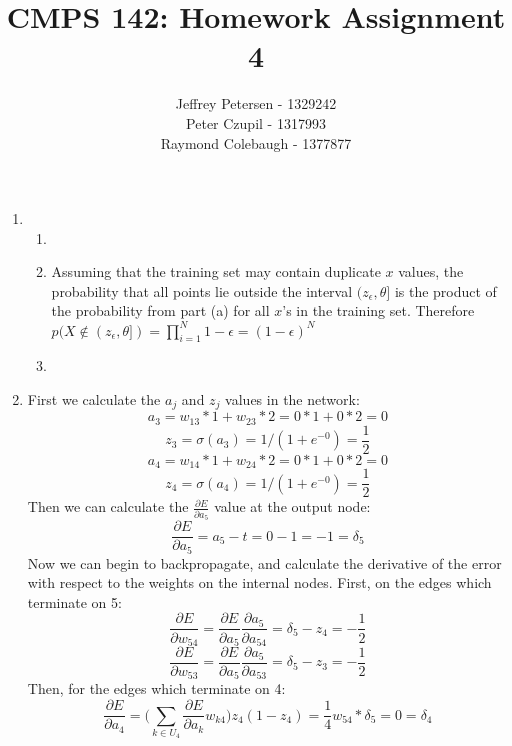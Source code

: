 \documentclass{article}
\title{CMPS 142: Homework Assignment 4}
\author{Jeffrey Petersen - 1329242\\Peter Czupil - 1317993\\Raymond Colebaugh - 1377877}
\begin{document}
\maketitle
\begin{enumerate}
        \item 
            \begin{enumerate}
                \item
                    \noindent{The probability that a point randomly drawn from $p$ is located somewhere in the interval $(z_{\epsilon}, \theta)$ is equal to $\epsilon$. Thus the probability that a point falls outside this interval is the complement of the previous probability. Therefore, $p((0, z_{\epsilon}]) = 1 - \epsilon$. }
                \item
                    Assuming that the training set may contain duplicate $x$ values, the probability that all points lie outside the interval $(z_{\epsilon}, \theta]$ is the product of the probability from part (a) for all $x$'s in the training set. Therefore $p(X \notin (z_{\epsilon}, \theta]) = \prod_{i = 1}^{N} 1 - \epsilon = (1 - \epsilon)^N$ 
                \item
            \end{enumerate}
        \item 
            First we calculate the $a_j$ and $z_j$ values in the network:
            $$ a_3 = w_{13} * 1 + w_{23} * 2 = 0 * 1 + 0 * 2 = 0 $$
            $$ z_3 = \sigma(a_3) = 1/(1+e^{-0}) = \frac{1}{2} $$
            $$ a_4 = w_{14} * 1 + w_{24} * 2 = 0 * 1 + 0 * 2 = 0 $$
            $$ z_4 = \sigma(a_4) = 1/(1+e^{-0}) = \frac{1}{2} $$
            Then we can calculate the $\frac{\partial E}{\partial a_5}$ value at the output node:
            $$ \frac{\partial E}{\partial a_5} = a_5 - t = 0 - 1 = -1 = \delta_5 $$
            Now we can begin to backpropagate, and calculate the derivative of the error with
            respect to the weights on the internal nodes. First, on the edges which terminate on 5:
            $$ \frac{\partial E}{\partial w_{54}} = \frac{\partial E}{\partial a_5} \frac{\partial a_5}{\partial a_{54}}
                = \delta_5 - z_4 = -\frac{1}{2}$$
            $$ \frac{\partial E}{\partial w_{53}} = \frac{\partial E}{\partial a_5} \frac{\partial a_5}{\partial a_{53}}
                = \delta_5 - z_3 = -\frac{1}{2}$$
            Then, for the edges which terminate on 4:
            $$ \frac{\partial E}{\partial a_4} = \Bigg( \sum_{k \in U_4} \frac{\partial E}{\partial a_k} w_{k4}\Bigg) z_4 (1 - z_4)
                = \frac{1}{4} w_{54} * \delta_5 = 0 = \delta_4 $$

\end{enumerate}
\end{document}
